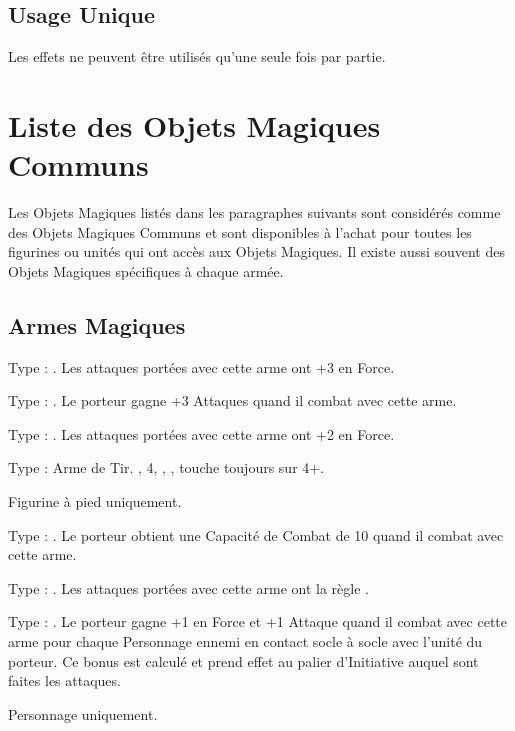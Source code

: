 \subsection{Usage Unique}

Les effets ne peuvent être utilisés qu'une seule fois par partie.

\section{Liste des Objets Magiques Communs}

Les Objets Magiques listés dans les paragraphes suivants sont considérés comme des Objets Magiques Communs et sont disponibles à l'achat pour toutes les figurines ou unités qui ont accès aux Objets Magiques. Il existe aussi souvent des Objets Magiques spécifiques à chaque armée.

\newpage
\hypertarget{magicalweapons}{\subsection{Armes Magiques}}
\label{magical_weapons}

\startpricelist

Type : \hw{}.  Les attaques portées avec cette arme ont +3 en Force.

Type : \hw{}. Le porteur gagne +3 Attaques quand il combat avec cette arme.

Type : \hw{}. Les attaques portées avec cette arme ont +2 en Force.

Type : Arme de Tir. , \Strength{} 4, , , touche toujours sur 4+.

Figurine à pied uniquement.

Type : \pw{}. Le porteur obtient une Capacité de Combat de 10 quand il combat avec cette arme.

Type : \hw{}. Les attaques portées avec cette arme ont la règle .

Type : \hw{}. Le porteur gagne +1 en Force et +1 Attaque quand il combat avec cette arme pour chaque Personnage ennemi en contact socle à socle avec l'unité du porteur. Ce bonus est calculé et prend effet au palier d'Initiative auquel sont faites les attaques.

Personnage uniquement.

